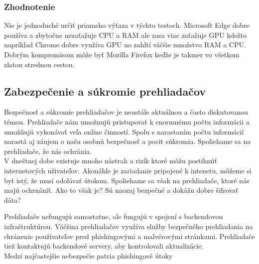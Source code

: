 \documentclass[10pt,Slovak,a4paper]{article}
\begin{document}
    \subsubsection{Zhodnotenie}
    \begin{paragraph}
        Nie je jednoduché určiť priameho výťaza v týchto testoch. Microsoft Edge dobre používa a zbytočne nezaťažuje CPU a RAM ale zasa viac zaťažuje GPU kdežto napríklad Chrome dobre využíva GPU no zahltí väčšie množstvo RAM a CPU. Dobrým kompromisom môže byť Mozilla Firefox keďže je takmer vo všetkom zlatou strednou cestou.
        \pagebreak
    \end{paragraph}
        

        
    \subsection{Zabezpečenie a súkromie prehliadačov}
        Bezpečnosť a súkromie prehliadačov je neustále aktuálnou a často diskutovanou témou. Prehliadače nám umožnujú pristupovať k enormnému počtu informácii a umožňujú vykonávať veľa online činností. Spolu s narastaním počtu informácií narastá aj záujem o našu osobnú bezpečnosť a pocit súkromia. Spoliehame sa na prehliadače, že nás ochránia. \\
        V dneštnej dobe existuje mnoho nástrah a rizík ktoré môžu postihnúť internetových uživateľov. Akonáhle je zariadanie pripojené k intenetu, môžeme si byť istý, že musí odolávať útokom. Spoliehame sa však na prehliadače, ktoré nás majú ochrnániť. Ako to však je? Sú naozaj bezpečné a dokážu dobre šifrovať dáta?

        \begin{paragraph}
            Prehliadače nefungujú samostatne, ale fungujú v spojení s backendovou infraštruktúrou. Väčšina prehliadačov využíva služby bezpečného prehliadania na
            chránenie používateľov pred phishingovými a malvérovými stránkami. Prehliadače tiež kontaktujú backendové servery, aby kontrolovali aktualizácie. 
            \cite{cite_whattheydo} \\
            Medzi najčastejšie nebezpečie patria phishingové útoky
        \end{paragraph}
\end{document}
